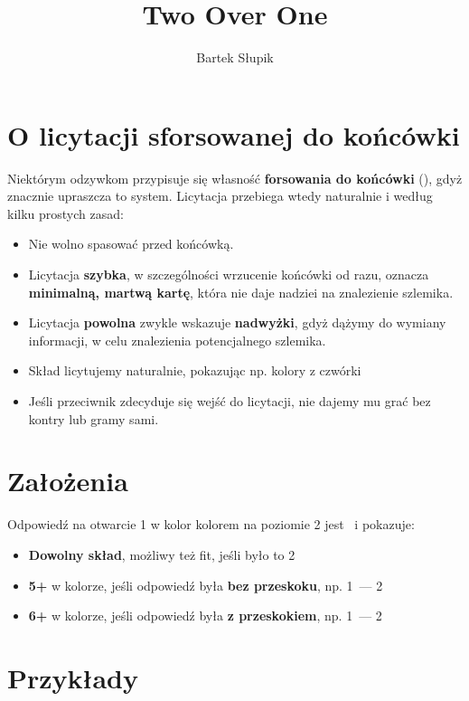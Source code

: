 \documentclass[12pt, a4paper]{article}
\title{Two Over One}
\author{Bartek Słupik}
\begin{document}
    \maketitle
    \section{O licytacji sforsowanej do końcówki}
    Niektórym odzywkom przypisuje się własność \textbf{forsowania do końcówki} (\gf),
    gdyż znacznie upraszcza to system. Licytacja przebiega wtedy naturalnie i według kilku prostych zasad:
    \begin{itemize}
        \item Nie wolno spasować przed końcówką.
        \item Licytacja \textbf{szybka}, w szczególności wrzucenie końcówki od razu, oznacza \textbf{minimalną, martwą kartę},
        która nie daje nadziei na znalezienie szlemika.
        \item Licytacja \textbf{powolna} zwykle wskazuje \textbf{nadwyżki}, gdyż dążymy do
        wymiany informacji, w celu znalezienia potencjalnego szlemika.
        \item Skład licytujemy naturalnie, pokazując np. kolory z czwórki
        \item Jeśli przeciwnik zdecyduje się wejść do licytacji, nie dajemy mu grać bez kontry lub gramy sami.
    \end{itemize}

    \section{Założenia}
    Odpowiedź na otwarcie 1 w kolor kolorem na poziomie 2 jest \gf\ i pokazuje:
    \begin{itemize}
        \item \textbf{Dowolny skład}, możliwy też fit, jeśli było to 2\clubs
        \item \textbf{5+} w kolorze, jeśli odpowiedź była \textbf{bez przeskoku}, np. 1\hearts\ --- 2\diams
        \item \textbf{6+} w kolorze, jeśli odpowiedź była \textbf{z przeskokiem}, np. 1\diams\ --- 2\spades
    \end{itemize}
    
    \section{Przykłady}
\end{document}
